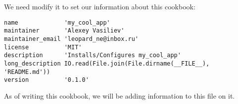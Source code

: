 We need modify it to set our information about this cookbook:

\begin{lstlisting}[label=lst:cookbook-metadata2,title=my-server-cloud/site-cookbooks/my\_cool\_app/metadata.rb]
name             'my_cool_app'
maintainer       'Alexey Vasiliev'
maintainer_email 'leopard_ne@inbox.ru'
license          'MIT'
description      'Installs/Configures my_cool_app'
long_description IO.read(File.join(File.dirname(__FILE__), 'README.md'))
version          '0.1.0'
\end{lstlisting}

As of writing this cookbook, we will be adding information to this file on it.
